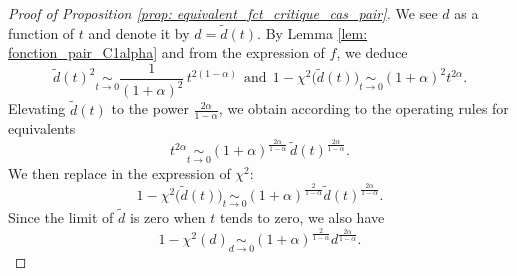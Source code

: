 \documentclass[11pt,reqno,a4paper]{article}%
\theoremstyle{definition}
\theoremstyle{remark}
\begin{document}
\begin{proof}[Proof of Proposition \ref{prop: equivalent_fct_critique_cas_pair}]
We see $d$ as a function of $t$ and denote it by $d=\tilde{d}(t)$.
By Lemma \ref{lem: fonction_pair_C1alpha} and from the expression of $f$, we deduce
$$\tilde{d}(t)^2  \underset{t \to 0}{\sim} \frac{1}{(1+\alpha)^2} \, t^{2(1-\alpha)}~~ \text{and} ~~  1 - \chi^2\big(\tilde{d}(t)\big) \underset{t \to 0}{\sim} (1+\alpha)^2 t^{2 \alpha}.$$
Elevating $\tilde{d}(t)$ to the power $\frac{2 \alpha}{1 - \alpha}$, we obtain according to the operating rules for equivalents
$$t^{2 \alpha}  \underset{t \to 0}{\sim} ( 1 + \alpha )^\frac{2 \alpha}{1-\alpha} \, \tilde{d}(t)^{ \frac{2 \alpha}{1-\alpha}}.$$ 
We then replace in the expression of $\chi^2$:
$$1 - \chi^2\big(\tilde{d}(t)\big) \underset{t \to 0}{\sim} (1+\alpha)^{ \frac{2}{1-\alpha}} \tilde{d}(t)^{ \frac{2 \alpha}{1 - \alpha}}.$$
Since the limit of $\tilde{d}$ is zero when $t$ tends to zero, we also have
$$1 - \chi^2(d) \underset{d \to 0}{\sim} (1+\alpha)^{ \frac{2}{1-\alpha}} d^{ \frac{2 \alpha}{1 - \alpha}}.$$
\end{proof}
\end{document}

